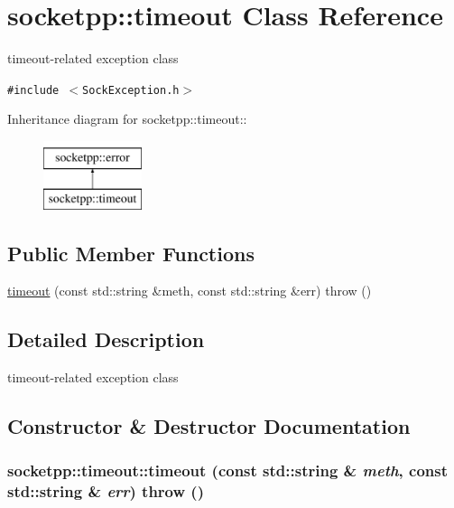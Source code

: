 \hypertarget{classsocketpp_1_1timeout}{
\section{socketpp::timeout Class Reference}
\label{classsocketpp_1_1timeout}
}
timeout-related exception class  


{\tt \#include $<$SockException.h$>$}

Inheritance diagram for socketpp::timeout::\begin{figure}[H]
\begin{center}
\leavevmode
\includegraphics[height=2cm]{classsocketpp_1_1timeout}
\end{center}
\end{figure}
\subsection*{Public Member Functions}
\begin{CompactItemize}
\item 
\hyperlink{classsocketpp_1_1timeout_5988708710ebd4e9b5675aa1dbde596f}{timeout} (const std::string \&meth, const std::string \&err)  throw ()
\end{CompactItemize}


\subsection{Detailed Description}
timeout-related exception class 

\subsection{Constructor \& Destructor Documentation}
\hypertarget{classsocketpp_1_1timeout_5988708710ebd4e9b5675aa1dbde596f}{
\subsubsection[{timeout}]{\setlength{\rightskip}{0pt plus 5cm}socketpp::timeout::timeout (const std::string \& {\em meth}, \/  const std::string \& {\em err})  throw ()}}
\label{classsocketpp_1_1timeout_5988708710ebd4e9b5675aa1dbde596f}


